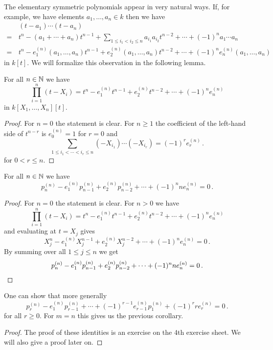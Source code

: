 The elementary symmetric polynomials appear in very natural ways.
If, for example, we have elements $a_1, \dotsc, a_n \in k$ then we have
\begin{align*}
   &\, (t-a_1) \dotsm (t-a_n) \\
  =&\, t^n - (a_1 + \dotsb + a_n) t^{n-1} + \sum_{1 \leq i_1 < i_2 \leq n} a_{i_1} a_{i_2} t^{n-2} + \dotsb + (-1)^n a_1 \dotsm a_n \\ 
  =&\, t^n - e^{(n)}_1(a_1, \dotsc, a_n) t^{n-1} + e^{(n)}_2(a_1, \dotsc, a_n) t^{n-2} + \dotsb + (-1)^n e^{(n)}_n(a_1, \dotsc, a_n)
\end{align*}
in $k[t]$.
We will formalize this observation in the following lemma.


\begin{lem}
  For all $n \in \mathbb{N}$ we have
  \[
      \prod_{i=1}^n (t-X_i)
    = t^n - e^{(n)}_1 t^{n-1} + e^{(n)}_2 t^{n-2} + \dotsb + (-1)^n e^{(n)}_n
  \]
  in $k[X_1, \dotsc, X_n][t]$.
\end{lem}
\begin{proof}
  For $n = 0$ the statement is clear.
  For $n \geq 1$ the coefficient of the left-hand side of $t^{n-r}$ is $e^{(n)}_0 = 1$ for $r = 0$ and
  \[
      \sum_{1 \leq i_1 < \dotsb < i_r \leq n} (-X_{i_1}) \dotsm (-X_{i_r})
    = (-1)^r e^{(n)}_r \,.
  \]
  for $0 < r \leq n$.
\end{proof}


\begin{cor}
  For all $n \in \mathbb{N}$ we have
  \[
      p^{(n)}_n - e^{(n)}_1 p^{(n)}_{n-1} + e^{(n)}_2 p^{(n)}_{n-2} + \dotsb + (-1)^n n e^{(n)}_n
    = 0 \,.
  \]
\end{cor}
\begin{proof}
  For $n = 0$ the statement is clear. For $n > 0$ we have
  \[
      \prod_{i=1}^n (t-X_i)
    = t^n - e^{(n)}_1 t^{n-1} + e^{(n)}_2 t^{n-2} + \dotsb + (-1)^n e^{(n)}_n
  \]
  and evaluating at $t = X_j$ gives
  \[
      X_j^n - e^{(n)}_1 X_j^{n-1} + e^{(n)}_2 X_j^{n-2} + \dotsb + (-1)^n e^{(n)}_n
    = 0 \,.
  \]
  By summing over all $1 \leq j \leq n$ we get
  \[
      p^{(n)}_n - e^{(n)}_1 p^{(n)}_{n-1} + e^{(n)}_2 p^{(n)}_{n-2} + \dotsb + (-1)^n n e^{(n)}_n
    = 0 \,.
    \qedhere
  \]
\end{proof}


\begin{rem}
  One can show that more generally
  \[
      p^{(n)}_r - e^{(n)}_1 p^{(n)}_{r-1} + \dotsb + (-1)^{r-1} e^{(n)}_{r-1} p^{(n)}_1 + (-1)^r r e^{(n)}_r
    = 0 \,.
  \]
  for all $r \geq 0$.
  For $m = n$ this gives us the previous corollary.
\end{rem}
\begin{proof}
  The proof of these identities is an exercise on the 4th exercise sheet.
  We will also give a proof later on.
\end{proof}


